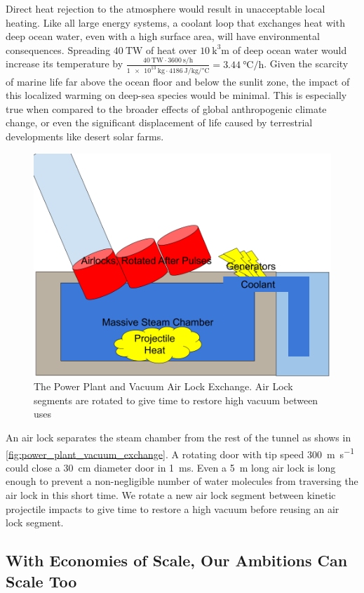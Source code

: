 \documentclass{article}
\begin{document}
Direct heat rejection to the atmosphere would result in unacceptable local heating. Like all large energy systems, a coolant loop that exchanges heat with deep ocean water, even with a high surface area, will have environmental consequences. Spreading $\SI{40}{\tera\watt}$ of heat over $\SI{10}{\cubic\kilo\meter}$ of deep ocean water would increase its temperature by $\frac{\SI{40}{\tera\watt}\cdot\SI{3600}{\second\per\hour}}{\SI{1e13}{\kilo\gram}\cdot\SI{4186}{\joule\per\kilo\gram\per\celsius}} = \SI{3.44}{\celsius\per\hour}$. 
Given the scarcity of marine life far above the ocean floor and below the sunlit zone, the impact of this localized warming on deep-sea species would be minimal. This is especially true when compared to the broader effects of global anthropogenic climate change, or even the significant displacement of life caused by terrestrial developments like desert solar farms.

\begin{figure}[!htpb]
    \centering
    \includegraphics[width=0.5\linewidth]{images/Power Plant Cooling and Generators.png}
    \caption{The Power Plant and Vacuum Air Lock Exchange.  Air Lock segments are rotated to give time to restore high vacuum between uses}
    \label{fig:power_plant_vacuum_exchange}
\end{figure}

An air lock separates the steam chamber from the rest of the tunnel as shows in \autoref{fig:power_plant_vacuum_exchange}.   A rotating door with tip speed \SI{300}{\meter\per\second} could close a \SI{30}{\centi\meter} diameter door in \SI{1}{\milli\second}.  Even a \SI{5}{\meter} long air lock is long enough to prevent a non-negligible number of water molecules from traversing the air lock in this short time.   We rotate a new air lock segment between kinetic projectile impacts to give time to restore a high vacuum before reusing an air lock segment.    


\subsection{With Economies of Scale, Our Ambitions Can Scale Too}\label{sec:strawway_economics}
\end{document}
